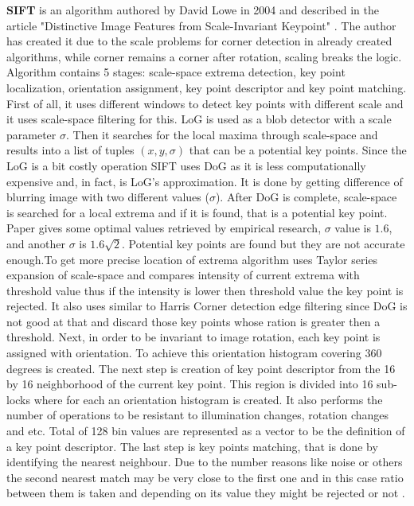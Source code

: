 \documentclass[../../../../main]{subfiles}
\begin{document}
\textbf{\ac{SIFT}} is an algorithm authored by David Lowe in 2004 and described in the article "Distinctive Image Features from Scale-Invariant Keypoint" \cite{distinctive_features_si_lowe}. The author has created it due to the scale problems for corner detection in already created algorithms, while corner remains a corner after rotation, scaling breaks the logic. Algorithm contains 5 stages: scale-space extrema detection, key point localization, orientation assignment, key point descriptor and key point matching. First of all, it uses different windows to detect key points with different scale and it uses scale-space filtering for this. \ac{LoG} is used as a blob detector with a scale parameter $\sigma$. Then it searches for the local maxima through scale-space and results into a list of tuples $(x,y,\sigma)$ that can be a potential key points. Since the  \ac{LoG} is a bit costly operation \ac{SIFT} uses \ac{DoG} as it is less computationally expensive and, in fact, is \ac{LoG}'s approximation. It is done by getting difference of blurring image with two different values ($\sigma$). After \ac{DoG} is complete, scale-space is searched for a local extrema and if it is found, that is a potential key point. Paper gives some optimal values retrieved by empirical research, $\sigma$ value is $1.6$, and another $\sigma$ is $1.6\sqrt{2}$. Potential key points are found but they are not accurate enough.To get more precise location of extrema algorithm uses Taylor series expansion of scale-space and compares intensity of current extrema with threshold value thus if the intensity is lower then threshold value the key point is rejected. It also uses similar to Harris Corner detection edge filtering since \ac{DoG} is not good at that and discard those key points whose ration is greater then a threshold. Next, in order to be invariant to image rotation, each key point is assigned with orientation. To achieve this orientation histogram covering 360 degrees is created. The next step is creation of key point descriptor from the 16 by 16 neighborhood of the current key point. This region is divided into 16 sub-locks where for each an orientation histogram is created. It also performs the number of operations to be resistant to illumination changes, rotation changes and etc. Total of 128 bin values are represented as a vector to be the definition of a key point descriptor. The last step is key points matching, that is done by identifying the nearest neighbour. Due to the number reasons like noise or others the second nearest match may be very close to the first one and in this case ratio between them is taken and depending on its value they might be rejected or not \cite{opencv_docs_sift}.
\end{document}
